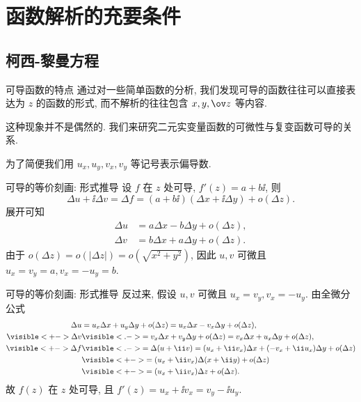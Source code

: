 \section{函数解析的充要条件}

\subsection{柯西-黎曼方程}
\begin{frame}{可导函数的特点}
	\onslide<+->
	通过对一些简单函数的分析, 我们发现可导的函数往往可以直接表达为 $z$ 的函数的形式, 而不解析的往往包含 $x,y,\ov z$ 等内容.

	\onslide<+->
	这种现象并不是偶然的.
	\onslide<+->
	我们来研究二元实变量函数的可微性与复变函数可导的关系.

	\onslide<+->
	为了简便我们用 $u_x,u_y,v_x,v_y$ 等记号表示偏导数.
\end{frame}


\begin{frame}{可导的等价刻画: 形式推导}
	\onslide<+->
	设 \alert{$f$ 在 $z$ 处可导}, $f'(z)=a+b\ii$,
	\onslide<+->
	则
		\[
			\Delta u+\ii\Delta v
			=\Delta f
			=(a+b\ii)(\Delta x+\ii\Delta y)+o(\Delta z).
		\]
	\onslide<+->
	展开可知
		\begin{align*}
			\Delta u&=a\Delta x-b\Delta y+o(\Delta z),\\
			\Delta v&=b\Delta x+a\Delta y+o(\Delta z).
		\end{align*}
	\onslide<+->
	由于 $o(\Delta z)=o(|\Delta z|)=o(\sqrt{x^2+y^2})$,
	\onslide<+->
	因此 \alert{$u,v$ 可微且 $u_x=v_y=a,v_x=-u_y=b$}.
\end{frame}


\begin{frame}{可导的等价刻画: 形式推导}
	\onslide<+->
	反过来, 假设 \alert{$u,v$ 可微且 $u_x=v_y, v_x=-u_y$}.
	\onslide<+->
	由全微分公式
		\begin{align*}
			\Delta u&=u_x\Delta x+u_y\Delta y+o(\Delta z)
				=u_x\Delta x-v_x\Delta y+o(\Delta z),\\
				\visible<+->{\Delta v}&\visible<.->{=v_x\Delta x+v_y\Delta y+o(\Delta z)
				=v_x\Delta x+u_x\Delta y+o(\Delta z),}\\
			\visible<+->{\Delta f}&
			\visible<.->{=\Delta (u+\ii v)=(u_x+\ii v_x)\Delta x+(-v_x+\ii u_x)\Delta y+o(\Delta z)}\\
			&\visible<+->{=(u_x+\ii v_x)\Delta(x+\ii y)+o(\Delta z)}\\
			&\visible<+->{=(u_x+\ii v_x)\Delta z+o(\Delta z).}
		\end{align*}
	\onslide<+->
	故 \alert{$f(z)$ 在 $z$ 处可导, 且 $f'(z)=u_x+\ii v_x=v_y-\ii u_y$}.
\end{frame}



